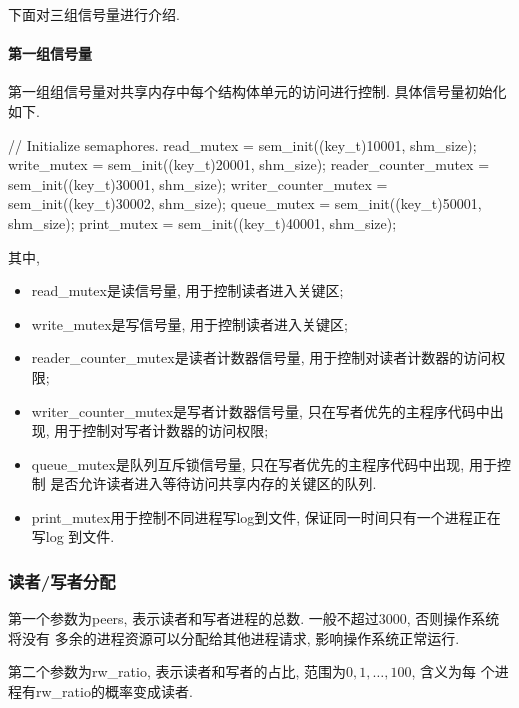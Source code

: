 下面对三组信号量进行介绍.

\paragraph{第一组信号量}
第一组组信号量对共享内存中每个结构体单元的访问进行控制. 具体信号量初始化如下.
\begin{code}
    // Initialize semaphores.
    read_mutex = sem_init((key_t)10001, shm_size);
    write_mutex = sem_init((key_t)20001, shm_size);
    reader_counter_mutex = sem_init((key_t)30001, shm_size);
    writer_counter_mutex = sem_init((key_t)30002, shm_size);
    queue_mutex = sem_init((key_t)50001, shm_size);
    print_mutex = sem_init((key_t)40001, shm_size);
\end{code}
其中,
\begin{itemize}
    \item read\_mutex是读信号量, 用于控制读者进入关键区;
    \item  write\_mutex是写信号量, 用于控制读者进入关键区;
    \item  reader\_counter\_mutex是读者计数器信号量, 用于控制对读者计数器的访问权限;
    \item writer\_counter\_mutex是写者计数器信号量, 只在写者优先的主程序代码中出现,
          用于控制对写者计数器的访问权限;
    \item queue\_mutex是队列互斥锁信号量, 只在写者优先的主程序代码中出现, 用于控制
          是否允许读者进入等待访问共享内存的关键区的队列.
    \item print\_mutex用于控制不同进程写log到文件, 保证同一时间只有一个进程正在写log
          到文件.
\end{itemize}

\subsubsection{读者/写者分配}
第一个参数为peers, 表示读者和写者进程的总数. 一般不超过3000, 否则操作系统将没有
多余的进程资源可以分配给其他进程请求, 影响操作系统正常运行.\par

第二个参数为rw\_ratio, 表示读者和写者的占比, 范围为$0, 1, \dots, 100$, 含义为每
个进程有rw\_ratio的概率变成读者.\par

